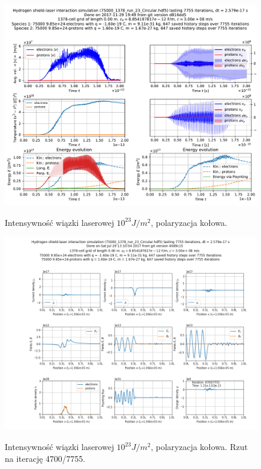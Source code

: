 \begin{figure}[h!]
  \includegraphics[width=\textwidth]{Images/75000_1378_run_23_Circular}
  \label{fig:laser-23-Circular}
  \caption{Intensywność wiązki laserowej $10^{23} J/m^2$, polaryzacja kołowa.}
\end{figure}

\begin{figure}[h!]
  \includegraphics[width=\textwidth]{Images/75000_1378_run_23_Circular_004700}
  \label{fig:laser-23-Circular-snapshot}
  \caption{Intensywność wiązki laserowej $10^{23} J/m^2$, polaryzacja kołowa. Rzut na iterację 4700/7755.}
\end{figure}




